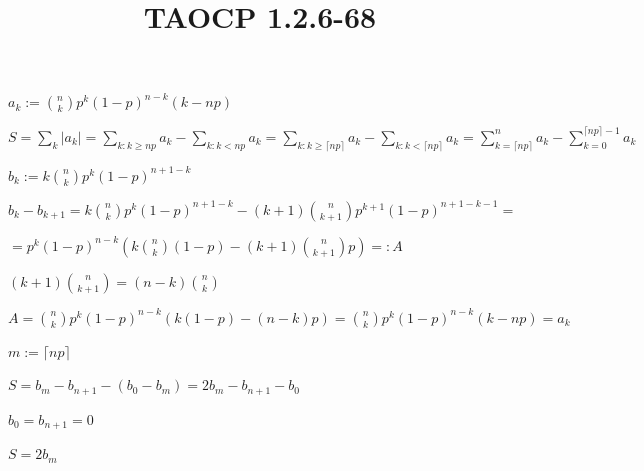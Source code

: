 \documentclass{article}
\title{TAOCP 1.2.6\mbox{-}68}
\begin{document}
\maketitle

\( a_{k} := \binom{n}{k}p^{k}{(1-p)}^{n-k}(k-np) \)

\( S = \sum_{k} |a_{k}| = \sum_{k: k \geq np} a_{k} - \sum_{k: k < np} a_{k} = \sum_{k: k \geq \lceil np \rceil} a_{k} - \sum_{k: k < \lceil np \rceil} a_{k} = \sum_{k = \lceil np \rceil}^{n} a_{k} - \sum_{k = 0}^{\lceil np \rceil - 1} a_{k} \)

\( b_{k} := k \binom{n}{k}p^{k}{(1-p)}^{n+1-k} \)

\( b_{k} - b_{k+1} = k \binom{n}{k}p^{k}{(1-p)}^{n+1-k} - (k+1) \binom{n}{k+1}p^{k+1}{(1-p)}^{n+1-k-1} = \)

\( = p^{k}{(1-p)}^{n-k} \left(k\binom{n}{k}(1-p) - (k+1)\binom{n}{k+1}p\right) =: A \)

\( (k+1)\binom{n}{k+1} = (n-k)\binom{n}{k} \)

\( A = \binom{n}{k}p^{k}{(1-p)}^{n-k}(k(1-p) - (n-k)p) = \binom{n}{k}p^{k}{(1-p)}^{n-k}(k - np) = a_{k} \)

\( m := \lceil np \rceil \)

\( S = b_{m} - b_{n+1} - (b_{0} - b_{m}) = 2b_{m} - b_{n+1} - b_{0} \)

\( b_{0} = b_{n+1} = 0 \)

\( S = 2b_{m} \)
\end{document}
